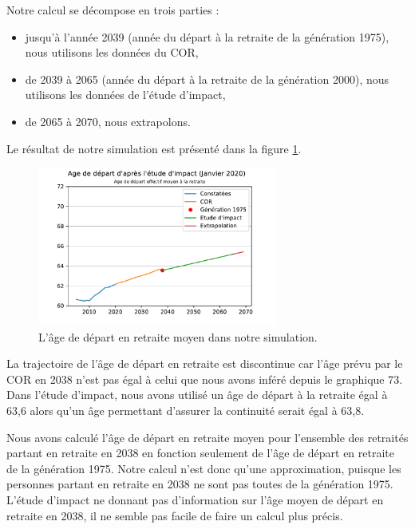 \documentclass[10pt]{article}
\begin{document}
Notre calcul se décompose en trois parties :
\begin{itemize}
\item jusqu'à l'année 2039 (année du départ à la retraite 
de la génération 1975), nous utilisons les données du COR, 
\item de 2039 à 2065 (année du départ à la retraite de la génération 
2000), nous utilisons les données de l'étude d'impact,
\item de 2065 à 2070, nous extrapolons. 
\end{itemize}


Le résultat de notre simulation est présenté dans la figure \ref{fig-simulation-A}. 

\begin{figure}
\begin{center}
\includegraphics[width=0.7\textwidth]{Simulation-Age.pdf}
\end{center}
\caption{L'âge de départ en retraite moyen dans notre simulation.}
\label{fig-simulation-A}
\end{figure}

La trajectoire de l'âge de départ en retraite est discontinue car l'âge prévu par le COR en 2038 n'est pas égal à celui que nous avons inféré depuis le graphique 73. Dans l'étude d'impact, nous avons utilisé un âge de départ à la retraite égal à 63,6 alors qu'un âge permettant d'assurer la continuité serait égal à 63,8.

Nous avons calculé l'âge de départ en retraite moyen pour l'ensemble des retraités partant en retraite en 2038 en fonction seulement de l'âge de départ en retraite de la génération 1975. Notre calcul n'est donc qu'une approximation, puisque les personnes partant en retraite en 2038 ne sont pas toutes de la génération 1975. L'étude d'impact ne donnant pas d'information sur l'âge moyen de départ en retraite en 2038, il ne semble pas facile de faire un calcul plus précis. 
\end{document}
